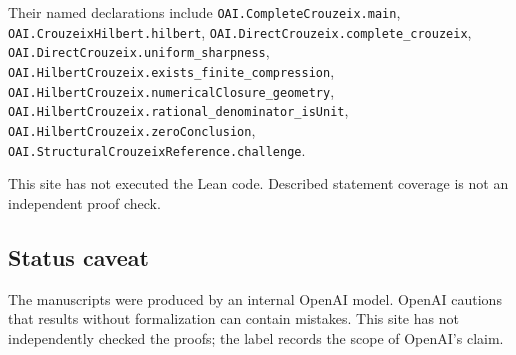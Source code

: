 \documentclass[11pt]{article}
\begin{document}
Their named declarations include \texttt{OAI.CompleteCrouzeix.main}, \texttt{OAI.CrouzeixHilbert.hilbert}, \texttt{OAI.DirectCrouzeix.complete\_crouzeix}, \texttt{OAI.DirectCrouzeix.uniform\_sharpness}, \texttt{OAI.HilbertCrouzeix.exists\_finite\_compression}, \texttt{OAI.HilbertCrouzeix.numericalClosure\_geometry}, \texttt{OAI.HilbertCrouzeix.rational\_denominator\_isUnit}, \texttt{OAI.HilbertCrouzeix.zeroConclusion}, \texttt{OAI.StructuralCrouzeixReference.challenge}.

This site has not executed the Lean code. Described statement coverage is not an independent proof check.

\subsection{Status caveat}
The manuscripts were produced by an internal OpenAI model. OpenAI cautions that results without formalization can contain mistakes. This site has not independently checked the proofs; the label records the scope of OpenAI's claim.
\end{document}
